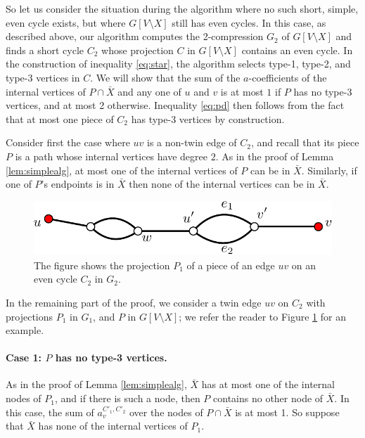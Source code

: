 \documentclass{article}
\newcommand{\0}{\mathbb{0}}
\newcommand{\1}{\mathbb{1}}
\begin{document}
So let us consider the situation during the algorithm where no such short, simple, even
cycle exists, but where $G[V\setminus X]$ still has even cycles. 
In this case, as described above, our algorithm computes the 2-compression $G_2$ of $G
[V\setminus X]$ and finds a short cycle $C_2$ whose projection $C$ in $G[V\setminus
X]$ contains an even cycle. In the construction of inequality \eqref{eq:star}, the
algorithm selects
type-1, type-2, and type-3 vertices in $C$.
We will show that the sum of the $a$-coefficients of
the internal vertices of $P \cap \bar{X}$ and any one of $u$ and $v$ is at most $1$ if $P$
has no type-3 vertices, and at most 2 otherwise. Inequality 
\eqref{eq:pd} then follows from the fact that at most one piece of $C_2$ has type-3
vertices by construction. 

Consider first the case where $uv$ is a non-twin edge of $C_2$, and recall that its
piece $P$ is a path whose internal vertices have degree $2$. As in the proof of Lemma 
\ref{lem:simplealg}, at most one of the internal vertices of $P$ can be in $\bar{X}$.
Similarly, if
one of $P$'s endpoints is in $\bar{X}$ then none of the internal vertices can be in
$\bar{X}$.

\begin{figure}
  \begin{center}
    \includegraphics[width=.5\textwidth]{piece.pdf}
  \end{center}  
  \caption{\label{fig:piece} The figure shows the projection $P_1$ of a piece of an
  edge $uv$ on an even
  cycle $C_2$ in $G_2$.}
\end{figure}  

In the remaining part of the proof, we consider a twin edge $uv$ on $C_2$ with
projections $P_1$ in $G_1$, and $P$ in $G[V\setminus X]$; we refer the reader
to Figure \ref{fig:piece} for an example.

\paragraph{Case 1: $P$ has no type-3 vertices.}

As in the proof of Lemma
\ref{lem:simplealg}, $\bar{X}$ has at most one of the internal nodes of $P_1$, and if
there is such a node, then $P$ contains no other node of $\bar{X}$. In this case, 
the sum of $a^{C'_1,C'_2}_v$ over the nodes of $P \cap \bar{X}$ is at most 1.
So suppose that $\bar{X}$ has none of the internal vertices of $P_1$. 
\end{document}
